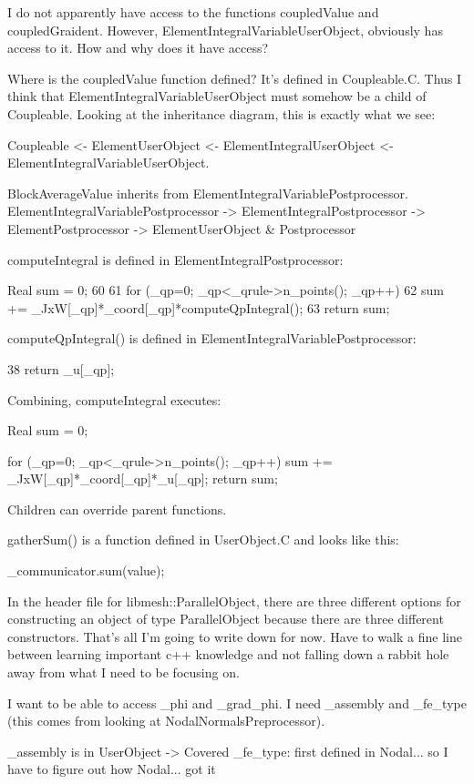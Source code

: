 {I do not apparently have access to the functions coupledValue and coupledGraident. However, ElementIntegralVariableUserObject, obviously has access to it. How and why does it have access?

Where is the coupledValue function defined? It's defined in Coupleable.C. Thus I think that ElementIntegralVariableUserObject must somehow be a child of Coupleable. Looking at the inheritance diagram, this is exactly what we see:

Coupleable <- ElementUserObject <- ElementIntegralUserObject <- ElementIntegralVariableUserObject.

BlockAverageValue inherits from ElementIntegralVariablePostprocessor. ElementIntegralVariablePostprocessor -> ElementIntegralPostprocessor -> ElementPostprocessor -> ElementUserObject & Postprocessor

computeIntegral is defined in ElementIntegralPostprocessor:

  Real sum = 0;
   60
   61   for (_qp=0; _qp<_qrule->n_points(); _qp++)
   62     sum += _JxW[_qp]*_coord[_qp]*computeQpIntegral();
   63   return sum;

computeQpIntegral() is defined in ElementIntegralVariablePostprocessor:

38  return _u[_qp];

Combining, computeIntegral executes:

  Real sum = 0;

      for (_qp=0; _qp<_qrule->n_points(); _qp++)
        sum += _JxW[_qp]*_coord[_qp]*_u[_qp];
      return sum;

Children can override parent functions.

gatherSum() is a function defined in UserObject.C and looks like this:

  _communicator.sum(value);

In the header file for libmesh::ParallelObject, there are three different options for constructing an object of type ParallelObject because there are three different constructors. That's all I'm going to write down for now. Have to walk a fine line between learning important c++ knowledge and not falling down a rabbit hole away from what I need to be focusing on.

I want to be able to access _phi and _grad_phi. I need _assembly and _fe_type (this comes from looking at NodalNormalsPreprocessor).

_assembly is in UserObject -> Covered
_fe_type: first defined in Nodal... so I have to figure out how Nodal... got it

}
